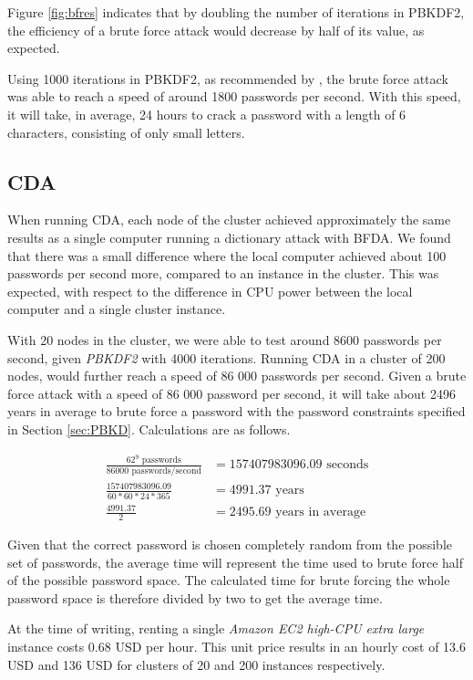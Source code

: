 \documentclass[pdftex,english,10pt,b5paper,twoside]{book}
\begin{document}
Figure \ref{fig:bfres} indicates that by doubling the number of iterations in
PBKDF2, the efficiency of a brute force attack would decrease by half of
its value, as expected.

Using 1000 iterations in \ac{PBKDF2}, as recommended by \citet{pbkdf2std}, the
brute force attack was able to reach a speed of around 1800 passwords per
second. With this speed, it will take, in average, 24 hours to crack a password
with a length of 6 characters, consisting of only small letters.

\subsection{\acl{CDA}}

When running \ac{CDA}, each node of the cluster achieved approximately the same
results as a single computer running a dictionary attack with \ac{BFDA}. We
found that there was a small difference where the local computer achieved about
100 passwords per second more, compared to an instance in the cluster. This was
expected, with respect to the difference in \ac{CPU} power between the local
computer and a single cluster instance. 

With 20 nodes in the cluster, we were able to test around 8600 passwords per
second, given \emph{PBKDF2} with 4000 iterations. Running \ac{CDA} in a cluster
of 200 nodes, would further reach a speed of 86 000 passwords per second. Given
a brute force attack with a speed of 86 000 password per second, it will take
about 2496 years in average to brute force a password with the password
constraints specified in Section \ref{sec:PBKD}. Calculations are as follows.

\begin{align*}
\frac{62^9 \text{ passwords}}{86000 \text{ passwords/second}} &= 157407983096.09 \text{ seconds} \\
\frac{157407983096.09}{60 * 60 * 24 * 365} &= 4991.37 \text{ years} \\
\frac{4991.37}{2} &= 2495.69 \text{ years in average}
\end{align*}

Given that the correct password is chosen completely random
from the possible set of passwords, the average time will represent the time
used to brute force half of the possible password space. The calculated time for
brute forcing the whole password space is therefore divided by two to get the average time.

At the time of writing, renting a single \emph{Amazon EC2 high-CPU extra large}
instance costs 0.68 USD per hour. This unit price results in an hourly cost of
13.6 USD and 136 USD for clusters of 20 and 200 instances respectively. 
\end{document}
